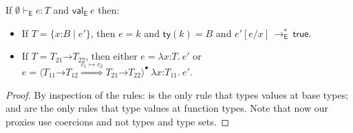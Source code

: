\documentclass[9pt]{extarticle}
\newcommand{\ottnt}[1]{\mathit{#1}}
\newcommand{\ottsym}[1]{#1}
\begin{document}
\begin{lemma}
  \label{lem:eideticcanonicalforms}
  If $ \emptyset   \vdash _{  \mathsf{E}  }  \ottnt{e}  :  \ottnt{T} $ and $ \mathsf{val} _{  \mathsf{E}  }~ \ottnt{e} $ then:
\begin{itemize}
  \item If $\ottnt{T}  \ottsym{=}   \{ \mathit{x} \mathord{:} \ottnt{B} \mathrel{\mid} \ottnt{e'} \} $, then $\ottnt{e}  \ottsym{=}  \ottnt{k}$ and $ \mathsf{ty} ( \ottnt{k} )   \ottsym{=}  \ottnt{B}$
    and $ \ottnt{e'}  [  \ottnt{e} / \mathit{x}  ]  \,  \longrightarrow ^{*}_{  \mathsf{E}  }  \,  \mathsf{true} $.
  \item If $\ottnt{T}  \ottsym{=}   \ottnt{T_{{\mathrm{21}}}} \mathord{ \rightarrow } \ottnt{T_{{\mathrm{22}}}} $, then either $\ottnt{e}  \ottsym{=}   \lambda \mathit{x} \mathord{:} \ottnt{T} .~  \ottnt{e'} $ or $\ottnt{e}  \ottsym{=}   \langle   \ottnt{T_{{\mathrm{11}}}} \mathord{ \rightarrow } \ottnt{T_{{\mathrm{12}}}}   \mathord{ \overset{ \ottnt{c_{{\mathrm{1}}}}  \mapsto  \ottnt{c_{{\mathrm{2}}}} }{\Rightarrow} }   \ottnt{T_{{\mathrm{21}}}} \mathord{ \rightarrow } \ottnt{T_{{\mathrm{22}}}}   \rangle^{\bullet} ~   \lambda \mathit{x} \mathord{:} \ottnt{T_{{\mathrm{11}}}} .~  \ottnt{e'}  $.
  \end{itemize}
{\iffull
  \begin{proof}
    By inspection of the rules:  is the only rule that types
    values at base types;  and  are the only rules
    that type values at function types. Note that now our proxies use
    coercions and not types and type sets.
  \end{proof}
  \fi}
\end{lemma}
\end{document}
